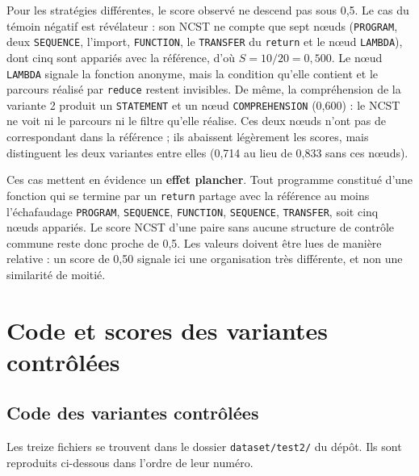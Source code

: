 \documentclass[12pt,a4paper,oneside]{report}
\begin{document}
Pour les stratégies différentes, le score observé ne descend pas sous 0,5.
Le cas du témoin négatif est révélateur : son NCST ne compte que sept nœuds
(\texttt{PROGRAM}, deux \texttt{SEQUENCE}, l'import, \texttt{FUNCTION}, le
\texttt{TRANSFER} du \texttt{return} et le nœud \texttt{LAMBDA}), dont cinq
sont appariés avec la référence, d'où $S = 10/20 = 0{,}500$. Le nœud
\texttt{LAMBDA} signale la fonction anonyme, mais la condition qu'elle
contient et le parcours réalisé par \texttt{reduce} restent invisibles. De
même, la compréhension de la variante 2 produit un \texttt{STATEMENT} et un
nœud \texttt{COMPREHENSION} (0,600) : le NCST ne voit ni le parcours ni le
filtre qu'elle réalise. Ces deux nœuds n'ont pas de correspondant dans la
référence ; ils abaissent légèrement les scores, mais distinguent les deux
variantes entre elles (0,714 au lieu de 0,833 sans ces nœuds).

Ces cas mettent en évidence un \textbf{effet plancher}. Tout programme
constitué d'une fonction qui se termine par un \texttt{return} partage avec
la référence au moins l'échafaudage \texttt{PROGRAM}, \texttt{SEQUENCE},
\texttt{FUNCTION}, \texttt{SEQUENCE}, \texttt{TRANSFER}, soit cinq nœuds
appariés. Le score NCST d'une paire sans aucune structure de contrôle commune
reste donc proche de 0,5. Les valeurs doivent être lues de manière relative :
un score de 0,50 signale ici une organisation très différente, et non une
similarité de moitié.


\chapter{Code et scores des variantes contrôlées}
\label{chap:annexes}

\section{Code des variantes contrôlées}
\label{ann:variantes}

Les treize fichiers se trouvent dans le dossier \texttt{dataset/test2/} du
dépôt. Ils sont reproduits ci-dessous dans l'ordre de leur numéro.
\end{document}
